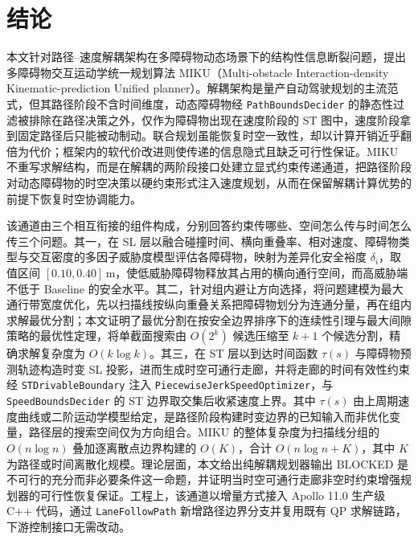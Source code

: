 \documentclass[a4paper,11pt]{ctexart}
\theoremstyle{definition}
\begin{document}
\section{结论}
\label{sec:conclusion}

本文针对路径--速度解耦架构在多障碍物动态场景下的结构性信息断裂问题，提出多障碍物交互运动学统一规划算法 MIKU（Multi-obstacle Interaction-density Kinematic-prediction Unified planner）。解耦架构是量产自动驾驶规划的主流范式，但其路径阶段不含时间维度，动态障碍物经 \texttt{PathBoundsDecider} 的静态性过滤被排除在路径决策之外，仅作为障碍物出现在速度阶段的 ST 图中，速度阶段拿到固定路径后只能被动制动。联合规划虽能恢复时空一致性，却以计算开销近乎翻倍为代价；框架内的软代价改进则使传递的信息隐式且缺乏可行性保证。MIKU 不重写求解结构，而是在解耦的两阶段接口处建立显式约束传递通道，把路径阶段对动态障碍物的时空决策以硬约束形式注入速度规划，从而在保留解耦计算优势的前提下恢复时空协调能力。

该通道由三个相互衔接的组件构成，分别回答约束传哪些、空间怎么传与时间怎么传三个问题。其一，在 SL 层以融合碰撞时间、横向重叠率、相对速度、障碍物类型与交互密度的多因子威胁度模型评估各障碍物，映射为差异化安全裕度 $\delta_i$，取值区间 $[0.10, 0.40]$\,m，使低威胁障碍物释放其占用的横向通行空间，而高威胁端不低于 Baseline 的安全水平。其二，针对组内避让方向选择，将问题建模为最大通行带宽度优化，先以扫描线按纵向重叠关系把障碍物划分为连通分量，再在组内求解最优分割；本文证明了最优分割在按安全边界排序下的连续性引理与最大间隙策略的最优性定理，将单截面搜索由 $O(2^k)$ 候选压缩至 $k+1$ 个候选分割，精确求解复杂度为 $O(k\log k)$。其三，在 ST 层以到达时间函数 $\tau(s)$ 与障碍物预测轨迹构造时变 SL 投影，进而生成时空可通行走廊，并将走廊的时间有效性约束经 \texttt{STDrivableBoundary} 注入 \texttt{PiecewiseJerkSpeedOptimizer}，与 \texttt{SpeedBoundsDecider} 的 ST 边界取交集后收紧速度上界。其中 $\tau(s)$ 由上周期速度曲线或二阶运动学模型给定，是路径阶段构建时变边界的已知输入而非优化变量，路径层的搜索空间仅为方向组合。MIKU 的整体复杂度为扫描线分组的 $O(n\log n)$ 叠加逐离散点边界构建的 $O(K)$，合计 $O(n\log n + K)$，其中 $K$ 为路径或时间离散化规模。理论层面，本文给出纯解耦规划器输出 BLOCKED 是不可行的充分而非必要条件这一命题，并证明当时空可通行走廊非空时约束增强规划器的可行性恢复保证。工程上，该通道以增量方式接入 Apollo 11.0 生产级 C++ 代码，通过 \texttt{LaneFollowPath} 新增路径边界分支并复用既有 QP 求解链路，下游控制接口无需改动。
\end{document}
